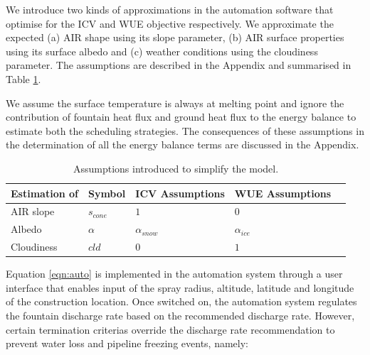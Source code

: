\documentclass[tc, manuscript]{copernicus}
\begin{document}
We introduce two kinds of approximations in the automation software that optimise for the ICV and WUE objective
respectively. We approximate the expected (a) AIR shape using its slope parameter, (b) AIR surface properties
using its surface albedo and (c) weather conditions using the cloudiness parameter. The assumptions are
described in the Appendix and summarised in Table \ref{tab:assumptions}. 

We assume the surface temperature is always at melting point and ignore the contribution of fountain heat
flux and ground heat flux to the energy balance to estimate both the scheduling strategies. The consequences of
these assumptions in the determination of all the energy balance terms are discussed in the Appendix.

\begin{table}[]
\centering
\caption{Assumptions introduced to simplify the model.}
\label{tab:assumptions}
\begin{tabular}{@{}lllll@{}}
\toprule
\textbf{Estimation of} & \textbf{Symbol} & \textbf{ICV Assumptions} & \textbf{WUE Assumptions} & \\ \midrule
\multicolumn{1}{|l}{AIR slope}        & $s_{cone}$ & $ 1 $ & $0$ & \multicolumn{1}{l|}{} \\ \midrule
\multicolumn{1}{|l}{Albedo} & $\alpha$ & $\alpha_{snow}$ & $\alpha_{ice}$ & \multicolumn{1}{l|}{} \\\midrule 
\multicolumn{1}{|l}{Cloudiness}  & $cld$ & $0$ & $1$ & \multicolumn{1}{l|}{} \\ \bottomrule
\end{tabular}
\end{table}

Equation \ref{eqn:auto} is implemented in the automation system through a user interface that enables input of
the spray radius, altitude, latitude and longitude of the construction location. Once switched on, the
automation system regulates the fountain discharge rate based on the recommended discharge rate. However,
certain termination criterias override the discharge rate recommendation to prevent water loss and pipeline
freezing events, namely: 
\end{document}
